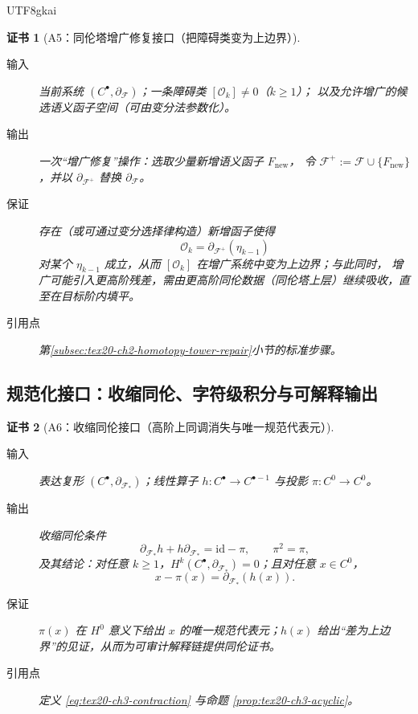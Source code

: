 \documentclass[12pt]{article}
\newtheorem{Certificate}{证书}[section]
\begin{document}
\begin{CJK*}{UTF8}{gkai}
\begin{Certificate}[A5：同伦塔增广修复接口（把障碍类变为上边界）]
\label{cert:tex20-appA-homotopy-tower-repair-interface}
\begin{description}
  \item[输入] 当前系统 $(C^\bullet,\partial_{\mathcal{F}})$；一条障碍类 $[\mathcal{O}_k]\neq 0$（$k\ge 1$）；
  以及允许增广的候选语义函子空间（可由变分法参数化）。
  \item[输出] 一次“增广修复”操作：选取少量新增语义函子 $F_{\mathrm{new}}$，
  令 $\mathcal{F}^{+}:=\mathcal{F}\cup\{F_{\mathrm{new}}\}$，并以 $\partial_{\mathcal{F}^{+}}$ 替换 $\partial_{\mathcal{F}}$。
  \item[保证] 存在（或可通过变分选择律构造）新增函子使得
  \[
  \mathcal{O}_k=\partial_{\mathcal{F}^{+}}(\eta_{k-1})
  \]
  对某个 $\eta_{k-1}$ 成立，从而 $[\mathcal{O}_k]$ 在增广系统中变为上边界；与此同时，
  增广可能引入更高阶残差，需由更高阶同伦数据（同伦塔上层）继续吸收，直至在目标阶内填平。
  \item[引用点] 第\ref{subsec:tex20-ch2-homotopy-tower-repair}小节的标准步骤。
\end{description}
\end{Certificate}

\subsection{规范化接口：收缩同伦、字符级积分与可解释输出}
\label{subsec:tex20-appA-normalization}

\begin{Certificate}[A6：收缩同伦接口（高阶上同调消失与唯一规范代表元）]
\label{cert:tex20-appA-contracting-homotopy-interface}
\begin{description}
  \item[输入] 表达复形 $(C^\bullet,\partial_{\mathcal{F}_\ast})$；线性算子 $h:C^\bullet\to C^{\bullet-1}$ 与投影 $\pi:C^0\to C^0$。
  \item[输出] 收缩同伦条件
  \[
  \partial_{\mathcal{F}_\ast}h+h\partial_{\mathcal{F}_\ast}=\mathrm{id}-\pi,
  \qquad \pi^2=\pi,
  \tag{A6.1}
  \label{eq:tex20-appA-contraction}
  \]
  及其结论：对任意 $k\ge 1$，$H^k(C^\bullet,\partial_{\mathcal{F}_\ast})=0$；且对任意 $x\in C^0$，
  \[
  x-\pi(x)=\partial_{\mathcal{F}_\ast}(h(x)).
  \]
  \item[保证] $\pi(x)$ 在 $H^0$ 意义下给出 $x$ 的唯一规范代表元；$h(x)$ 给出“差为上边界”的见证，从而为可审计解释链提供同伦证书。
  \item[引用点] 定义 \eqref{eq:tex20-ch3-contraction} 与命题 \ref{prop:tex20-ch3-acyclic}。
\end{description}
\end{Certificate}


\end{CJK*}
\end{document}
